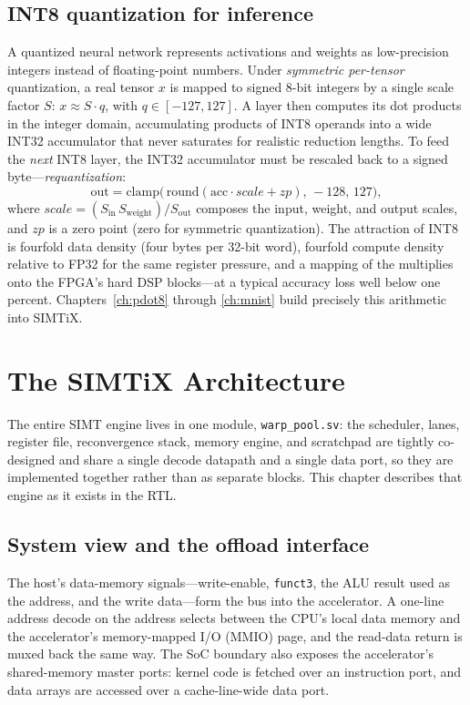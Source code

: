 \documentclass[12pt,a4paper,oneside]{report}
\newcommand{\code}[1]{\texttt{#1}}
\begin{document}
\section{INT8 quantization for inference}
A quantized neural network represents activations and weights as low-precision
integers instead of floating-point numbers. Under \emph{symmetric per-tensor}
quantization, a real tensor $x$ is mapped to signed 8-bit integers by a single
scale factor $S$: $x \approx S\cdot q$, with $q\in[-127,127]$. A layer then
computes its dot products in the integer domain, accumulating products of INT8
operands into a wide INT32 accumulator that never saturates for realistic
reduction lengths. To feed the \emph{next} INT8 layer, the INT32 accumulator must
be rescaled back to a signed byte---\emph{requantization}:
\begin{equation}
\mathrm{out} = \mathrm{clamp}\big(\,\mathrm{round}(\mathrm{acc}\cdot \mathit{scale} + \mathit{zp}),\,-128,\,127\big),
\label{eq:requant}
\end{equation}
where $\mathit{scale}=(S_{\text{in}}\,S_{\text{weight}})/S_{\text{out}}$ composes
the input, weight, and output scales, and $\mathit{zp}$ is a zero point (zero for
symmetric quantization). The attraction of INT8 is fourfold data density (four
bytes per 32-bit word), fourfold compute density relative to FP32 for the same
register pressure, and a mapping of the multiplies onto the FPGA's hard DSP
blocks---at a typical accuracy loss well below one percent. Chapters~\ref{ch:pdot8}
through \ref{ch:mnist} build precisely this arithmetic into SIMTiX.

\chapter{The SIMTiX Architecture}
\label{ch:arch}

The entire SIMT engine lives in one module, \code{warp\_pool.sv}: the scheduler,
lanes, register file, reconvergence stack, memory engine, and scratchpad are
tightly co-designed and share a single decode datapath and a single data port, so
they are implemented together rather than as separate blocks. This chapter
describes that engine as it exists in the RTL.

\section{System view and the offload interface}
The host's data-memory signals---write-enable, \code{funct3}, the ALU result used
as the address, and the write data---form the bus into the accelerator. A one-line
address decode on the address selects between the CPU's local data memory and the
accelerator's memory-mapped I/O (MMIO) page, and the read-data return is muxed
back the same way. The SoC boundary also exposes the accelerator's shared-memory
master ports: kernel code is fetched over an instruction port, and data arrays
are accessed over a cache-line-wide data port.
\end{document}
